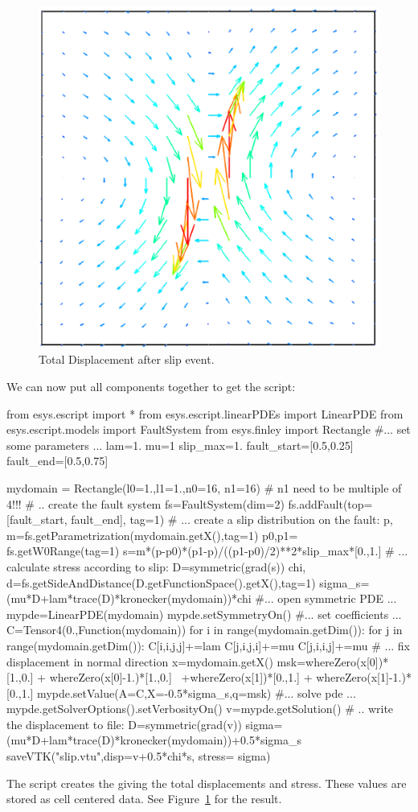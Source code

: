 \begin{figure} [ht]
\centerline{\includegraphics[width=\figwidth]{figures/Slip2}}
\caption{Total Displacement after slip event.}
\label{fig:slip.2}
\end{figure}

We can now put all components together to get the script:
\begin{python}
from esys.escript import *
from esys.escript.linearPDEs import LinearPDE
from esys.escript.models import FaultSystem
from esys.finley import Rectangle
#... set some parameters ...
lam=1.
mu=1
slip_max=1.
fault_start=[0.5,0.25]
fault_end=[0.5,0.75]

mydomain = Rectangle(l0=1.,l1=1.,n0=16, n1=16)  # n1 need to be multiple of 4!!!
# .. create the fault system
fs=FaultSystem(dim=2)
fs.addFault(top=[fault_start, fault_end], tag=1)
# ... create a slip distribution on the fault:
p, m=fs.getParametrization(mydomain.getX(),tag=1)
p0,p1= fs.getW0Range(tag=1)
s=m*(p-p0)*(p1-p)/((p1-p0)/2)**2*slip_max*[0.,1.]
# ... calculate stress according to slip:
D=symmetric(grad(s))
chi, d=fs.getSideAndDistance(D.getFunctionSpace().getX(),tag=1)
sigma_s=(mu*D+lam*trace(D)*kronecker(mydomain))*chi
#... open symmetric PDE ...
mypde=LinearPDE(mydomain)
mypde.setSymmetryOn()
#... set coefficients ...
C=Tensor4(0.,Function(mydomain))
for i in range(mydomain.getDim()):
  for j in range(mydomain.getDim()):
     C[i,i,j,j]+=lam
     C[j,i,j,i]+=mu
     C[j,i,i,j]+=mu
# ... fix displacement in normal direction 
x=mydomain.getX()
msk=whereZero(x[0])*[1.,0.] + whereZero(x[0]-1.)*[1.,0.] \
   +whereZero(x[1])*[0.,1.] + whereZero(x[1]-1.)*[0.,1.]
mypde.setValue(A=C,X=-0.5*sigma_s,q=msk)
#... solve pde ...
mypde.getSolverOptions().setVerbosityOn()
v=mypde.getSolution()
# .. write the displacement to file:
D=symmetric(grad(v))
sigma=(mu*D+lam*trace(D)*kronecker(mydomain))+0.5*sigma_s
saveVTK("slip.vtu",disp=v+0.5*chi*s, stress= sigma)
\end{python}
The script creates the  giving the total displacements and stress. These values are stored as cell 
centered data. See Figure~\ref{fig:slip.2} for the result.
